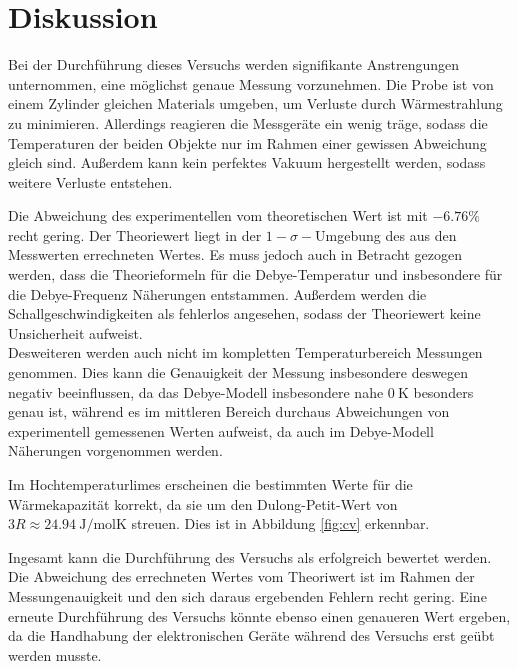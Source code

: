 \section{Diskussion}
\label{sec:Diskussion}

Bei der Durchführung dieses Versuchs werden signifikante Anstrengungen unternommen, eine möglichst genaue Messung vorzunehmen.
Die Probe ist von einem Zylinder gleichen Materials umgeben, um Verluste durch Wärmestrahlung zu minimieren.
Allerdings reagieren die Messgeräte ein wenig träge, sodass die Temperaturen der beiden Objekte nur im Rahmen einer gewissen Abweichung gleich sind. Außerdem kann kein perfektes Vakuum hergestellt werden, sodass weitere Verluste entstehen.

Die Abweichung des experimentellen vom theoretischen Wert ist mit $-6.76\%$ recht gering.
Der Theoriewert liegt in der $1-\sigma-$Umgebung des aus den Messwerten errechneten
Wertes. Es muss jedoch auch in Betracht gezogen werden, dass die Theorieformeln für die Debye-Temperatur und insbesondere für die Debye-Frequenz Näherungen entstammen. Außerdem werden die Schallgeschwindigkeiten als fehlerlos angesehen, sodass der Theoriewert keine Unsicherheit aufweist.\\
Desweiteren werden auch nicht im kompletten Temperaturbereich Messungen genommen. Dies kann die Genauigkeit der Messung insbesondere deswegen negativ beeinflussen, da das Debye-Modell insbesondere nahe $\SI{0}{\kelvin}$ besonders genau ist, während es im mittleren Bereich durchaus Abweichungen von experimentell gemessenen Werten aufweist, da auch im Debye-Modell Näherungen vorgenommen werden.

Im Hochtemperaturlimes erscheinen die bestimmten Werte für die Wärmekapazität korrekt,
da sie um den Dulong-Petit-Wert von $3R \approx \SI{24.94}{\joule\per\mole\kelvin}$ streuen.
Dies ist in Abbildung \ref{fig:cv} erkennbar.

Ingesamt kann die Durchführung des Versuchs als erfolgreich bewertet werden.
Die Abweichung des errechneten Wertes vom Theoriwert ist im Rahmen der Messungenauigkeit
und den sich daraus ergebenden Fehlern recht gering.
Eine erneute Durchführung des Versuchs könnte ebenso einen genaueren Wert ergeben, da die Handhabung der elektronischen Geräte während des Versuchs erst geübt werden musste.

%
%
%
